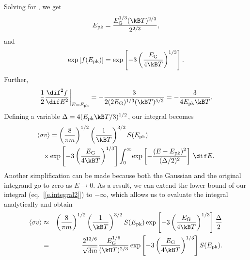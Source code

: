 \begin{sidebar}
Solving for \Epk, we get
\[
\Epk = \frac{\EG^{1/3}(\kB T)^{2/3}}{2^{2/3}},
\]
and 
\[ \exp\left[f(\Epk)\right] = \exp\left[-3\left(\frac{\EG}{4\kB T}\right)^{1/3}\right].
\]
Further,
\[
\left.\frac{1}{2}\frac{\dif^{2}f}{\dif E^{2}}\right|_{E=\Epk} = -\frac{3}{2(2\EG)^{1/3}(\kB T)^{5/3}} = -\frac{3}{4\Epk \kB T}.
\]
Defining a variable $\Delta = 4(\Epk \kB T/3)^{1/2}$, our integral becomes
\begin{eqnarray}\label{e.integral2}
\lefteqn{\langle\sigma v\rangle = \left(\frac{8}{\pi m}\right)^{1/2}\left(\frac{1}{\kB T}\right)^{3/2} S(\Epk)} \nonumber\\
&&\times 
  \exp\left[-3\left(\frac{\EG}{4\kB T}\right)^{1/3}\right]\int_{0}^{\infty}\!\exp\left[-\frac{(E-\Epk)^{2}}{(\Delta/2)^{2}}\right]\,\dif E.
\end{eqnarray}
Another simplification can be made because both the Gaussian and the original integrand go to zero as $E\to 0$.  As a result, we can extend the lower bound of our integral (eq.~[\ref{e.integral2}]) to $-\infty$, which allows us to evaluate the integral analytically and obtain
\begin{eqnarray}\label{e.rate2}
\langle\sigma v\rangle &\approx& \left(\frac{8}{\pi m}\right)^{1/2}\left(\frac{1}{\kB T}\right)^{3/2} S(\Epk) \exp\left[-3\left(\frac{\EG}{4\kB T}\right)^{1/3}\right]\frac{\Delta}{2}\nonumber\\
 &=& \frac{2^{13/6}}{\sqrt{3m}}\frac{\EG^{1/6}}{(\kB T)^{2/3}} \exp\left[-3\left(\frac{\EG}{4\kB T}\right)^{1/3}\right]  S(\Epk).
\end{eqnarray}
\end{sidebar}


